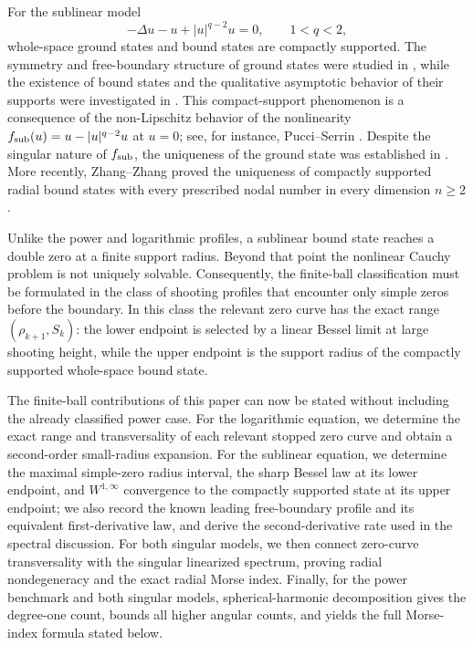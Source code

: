 \documentclass[11pt]{article}
\begin{document}
For the sublinear model
\[
 -\Delta u-u+|u|^{q-2}u=0,
 \qquad 1<q<2,
\]
whole-space ground states and bound states are compactly supported.
The symmetry and free-boundary structure of ground states were studied in
\cite{CortazarDelPinoElgueta1,CortazarDelPinoElgueta2,CortazarElguetaFelmer,Gui,IkomaTanakaWangZhang},
while the existence of bound states and the qualitative asymptotic behavior of their supports were investigated in
\cite{BalabaneDolbeaultOunaies,GazzolaSerrinTang}.
This compact-support phenomenon is a consequence of the non-Lipschitz
behavior of the nonlinearity $f_{\rm sub}(u)=u-|u|^{q-2}u$ at $u=0$; see, for instance, Pucci--Serrin \cite{PucciSerrin}. Despite the singular nature of $f_{\rm sub}$, the uniqueness of the ground state was established in \cite{PeletierSerrin,SerrinTang}. More recently,
Zhang--Zhang \cite{ZhangZhang} proved the uniqueness of compactly supported
{radial bound states with every prescribed nodal number} in every
dimension $n\ge2$.

{Unlike the power and logarithmic profiles, a sublinear bound
state reaches a double zero at a finite support radius.  Beyond that point the
nonlinear Cauchy problem is not uniquely solvable.  Consequently, the
finite-ball classification must be formulated in the class of shooting
profiles that encounter only simple zeros before the boundary.  In this class
the relevant zero curve has the exact range $(\rho_{k+1},S_k)$: the lower
endpoint is selected by a linear Bessel limit at large shooting height, while
the upper endpoint is the support radius of the compactly supported
whole-space {bound state}.}

{The finite-ball contributions of this paper can now be stated without
including the already classified power case.  For the logarithmic equation,
we determine the exact range and transversality of each relevant stopped zero
curve and obtain a second-order small-radius expansion.  For the sublinear
equation, we determine the maximal simple-zero radius interval, the sharp
Bessel law at its lower endpoint, and $W^{1,\infty}$ convergence to the
compactly supported state at its upper endpoint; we also record the known
leading free-boundary profile and its equivalent first-derivative law, and
derive the second-derivative rate used in the spectral discussion.  For both
singular models, we then connect zero-curve
transversality with the singular linearized spectrum, proving radial
nondegeneracy and the exact radial Morse index.  Finally, for the power
benchmark and both singular models, spherical-harmonic decomposition gives
the degree-one count, bounds all higher angular counts, and yields the full
Morse-index formula stated below.}
\end{document}
